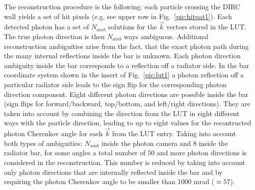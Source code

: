The reconstruction procedure is the following: each particle crossing the DIRC wall yields a set of hit pixels (e.g. see upper row in Fig.~\ref{pic:hitpat1}). Each detected photon has a set of $N_{amb}$ solutions for the $\vec k$ vectors stored in the LUT. The true photon direction is then $N_{amb}$ ways ambiguous. Additional reconstruction ambiguities arise from the fact, that the exact photon path during the many internal reflections inside the bar is unknown.  
Each photon direction ambiguity inside the bar corresponds to a reflection off a radiator side. In the bar coordinate system shown in the insert of Fig.~\ref{pic:lut1} a photon reflection off a particular radiator side leads to the sign flip for the corresponding photon direction component. Eight different photon directions are possible inside the bar (sign flips for forward/backward, top/bottom, and left/right directions). They are taken into account by combining the direction from the LUT in eight different ways with the particle direction, leading to up to eight values for the recontructed photon Cherenkov angle for each $\vec k$ from the LUT entry.
Taking into account both types of ambiguities: $N_{amb}$ inside the photon camera and $8$ inside the radiator bar, for some angles a total number of $50$ and more photon directions is considered in the reconstruction.  This number is reduced by taking into account only photon directions that are internally reflected inside the bar and by requiring the photon Cherenkov angle to be smaller than 1000 mrad ($\approx 57$\mydeg).


